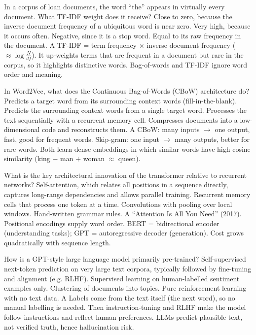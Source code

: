 {In a corpus of loan documents, the word ``the'' appears in virtually every document. What TF-IDF weight does it receive?}
{Close to zero, because the inverse document frequency of a ubiquitous word is near zero.}
{Very high, because it occurs often.}
{Negative, since it is a stop word.}
{Equal to its raw frequency in the document.}
{A}
{TF-IDF = term frequency $\times$ inverse document frequency ($\approx\log\frac{N}{df}$). It up-weights terms that are frequent in a document but rare in the corpus, so it highlights distinctive words. Bag-of-words and TF-IDF ignore word order and meaning.}

{In Word2Vec, what does the Continuous Bag-of-Words (CBoW) architecture do?}
{Predicts a target word from its surrounding context words (fill-in-the-blank).}
{Predicts the surrounding context words from a single target word.}
{Processes the text sequentially with a recurrent memory cell.}
{Compresses documents into a low-dimensional code and reconstructs them.}
{A}
{CBoW: many inputs $\rightarrow$ one output, fast, good for frequent words. Skip-gram: one input $\rightarrow$ many outputs, better for rare words. Both learn dense embeddings in which similar words have high cosine similarity (king $-$ man $+$ woman $\approx$ queen).}

{What is the key architectural innovation of the transformer relative to recurrent networks?}
{Self-attention, which relates all positions in a sequence directly, captures long-range dependencies and allows parallel training.}
{Recurrent memory cells that process one token at a time.}
{Convolutions with pooling over local windows.}
{Hand-written grammar rules.}
{A}
{``Attention Is All You Need'' (2017). Positional encodings supply word order. BERT = bidirectional encoder (understanding tasks); GPT = autoregressive decoder (generation). Cost grows quadratically with sequence length.}

{How is a GPT-style large language model primarily pre-trained?}
{Self-supervised next-token prediction on very large text corpora, typically followed by fine-tuning and alignment (e.g. RLHF).}
{Supervised learning on human-labelled sentiment examples only.}
{Clustering of documents into topics.}
{Pure reinforcement learning with no text data.}
{A}
{Labels come from the text itself (the next word), so no manual labelling is needed. Then instruction-tuning and RLHF make the model follow instructions and reflect human preferences. LLMs predict plausible text, not verified truth, hence hallucination risk.}

